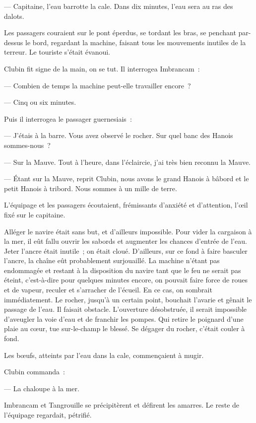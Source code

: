 \documentclass[french,twoside]{book} %
\begin{document}
— Capitaine, l’eau barrotte la cale. Dans dix minutes, l’eau sera au ras des dalots.\par
Les passagers couraient sur le pont éperdus, se tordant les bras, se penchant par-dessus le bord, regardant la machine, faisant tous les mouvements inutiles de la terreur. Le touriste s’était évanoui.\par
Clubin fit signe de la main, on se tut. Il interrogea Imbrancam :\par
 — Combien de temps la machine peut-elle travailler encore ?\par
— Cinq ou six minutes.\par
Puis il interrogea le passager guernesiais :\par
— J’étais à la barre. Vous avez observé le rocher. Sur quel banc des Hanois sommes-nous ?\par
— Sur la Mauve. Tout à l’heure, dans l’éclaircie, j’ai très bien reconnu la Mauve.\par
— Étant sur la Mauve, reprit Clubin, nous avons le grand Hanois à bâbord et le petit Hanois à tribord. Nous sommes à un mille de terre.\par
L’équipage et les passagers écoutaient, frémissants d’anxiété et d’attention, l’œil fixé sur le capitaine.\par
Alléger le navire était sans but, et d’ailleurs impossible. Pour vider la cargaison à la mer, il eût fallu ouvrir les sabords et augmenter les chances d’entrée de l’eau. Jeter l’ancre était inutile ; on était cloué. D’ailleurs, sur ce fond à faire basculer l’ancre, la chaîne eût probablement surjouaillé. La machine n’étant pas endommagée et restant à la disposition du navire tant que le feu ne serait pas éteint, c’est-à-dire pour quelques minutes encore, on pouvait faire force de roues et de vapeur, reculer et s’arracher de l’écueil. En ce cas, on sombrait immédiatement. Le rocher, jusqu’à un certain point, bouchait l’avarie et gênait le passage de l’eau. Il faisait obstacle. L’ouverture désobstruée, il serait impossible d’aveugler la voie d’eau et de franchir les pompes. Qui retire le poignard d’une plaie au cœur, tue sur-le-champ le blessé. Se dégager du rocher, c’était couler à fond.\par
 Les bœufs, atteints par l’eau dans la cale, commençaient à mugir.\par
Clubin commanda :\par
— La chaloupe à la mer.\par
Imbrancam et Tangrouille se précipitèrent et défirent les amarres. Le reste de l’équipage regardait, pétrifié.\par
\end{document}
